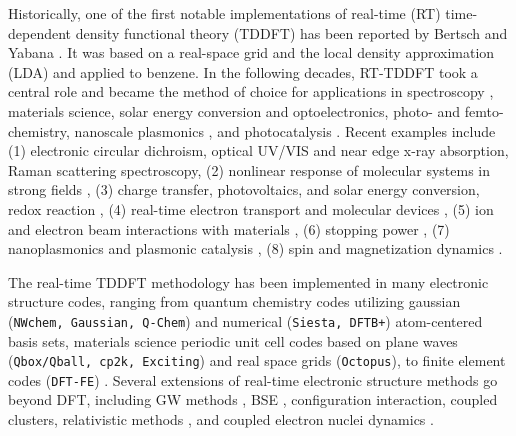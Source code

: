 \documentclass[journal=jctcce,manuscript=article,etalmode=truncate,maxauthors=10,layout=twocolumn,9pt]{achemso}   %
\begin{document}
Historically,  one of the first notable implementations of real-time (RT)  time-dependent density functional theory (TDDFT) has  been reported by  Bertsch and Yabana \cite{bertsch-96}. It   was based  on a real-space grid  and the local density approximation (LDA)  and applied  to benzene.
In the following decades, RT-TDDFT 
took a central  role  and became the method of choice for applications  in spectroscopy \cite{chem-rev-Li}, materials science, solar energy conversion and optoelectronics\cite{review-photovoltaics}, photo- and femto-chemistry, nanoscale plasmonics \cite{LSPR-review}, and photocatalysis \cite{chem-rev-Li,CO2-AuNP}.  
Recent examples include 
(1) electronic circular dichroism, optical UV/VIS and near edge x-ray  absorption, Raman scattering spectroscopy\cite{lopata-2011,raman-govind-2013,Yabana-dichrosim-2011,Rubio-angular-2017,xray-herbert-2023}, 
(2) nonlinear response of molecular systems in strong fields \cite{Mukamel-2018,non-linear-Gross-2015,Li-hyperpolarizabilities-2013}, 
(3) charge transfer, photovoltaics,  and solar energy conversion, redox reaction \cite{review-photovoltaics,chem-rev-Li,charge-transfer-isborn-2023,lvn-ct-2012}, 
(4)  real-time electron transport and molecular devices  \cite{rt-transport-Kummel-2016,rt-transport-hod-jpca-2016,rt-transport-hod-jpcc-2016},
(5) ion and electron beam interactions with materials \cite{AccMatRes-2024,theo-comp-chem-DBL-2022,theo-comp-chem-JJ-2022,JCTC-2020,tao-2021}, 
(6) stopping power \cite{baczewski-23,schleife,Ievlev}, 
(7) nanoplasmonics and plasmonic catalysis \cite{wong-plasmonic-antennas-2017,wong-plasmonics-waveguide-2018,plasmonic-catalysis-montemore,tao-2021}, 
(8) spin  and  magnetization dynamics \cite{spin-rt-tddft-Li-2014,spin-rt-tddft-Li-2016,x2c-Ruud-2016,LvN-spin-Hod-Scuseria-2015}.

The real-time TDDFT methodology has been implemented in many electronic structure  codes,  ranging from  quantum chemistry  codes  utilizing gaussian (\texttt{NWchem, Gaussian, Q-Chem}) and numerical (\texttt{Siesta, DFTB+}) atom-centered basis sets, \cite{lopata-2011,rt-dftb-Wong,rt-tddft-qchem,siesta-2007,DFTB+} materials science periodic unit cell codes based on plane waves (\texttt{Qbox/Qball, cp2k, Exciting}) and real space grids (\texttt{Octopus}), \cite{octopus,qball-2017,qball-II-2021,cp2k-2020}  to finite element codes (\texttt{DFT-FE}) \cite{gavini-rt-tddft}.   
Several extensions of real-time electronic structure methods go  beyond DFT,  including GW  methods  \cite{rt-GW-jctc-2019,rt-GW-rabani-2014}, BSE \cite{rt-BSE-2011}, configuration interaction, coupled clusters\cite{Gordon-2012,tdci-saalfrank-2007,tdci-Li-2018,rt-cc-dePrince-2016},  relativistic methods \cite{x2c-Ruud-2016,spin-rt-tddft-Li-2016}, and  coupled  electron  nuclei dynamics  \cite{Thruhlar-2018,ExactFactorization-2012,namd-dftb,ehrenfest-gaussian-2007,lvnmd,lvnmd-c2,rt-tddft-md-siesta-2016,pyxaid-2013,qball-II-2021}. 
\end{document}
